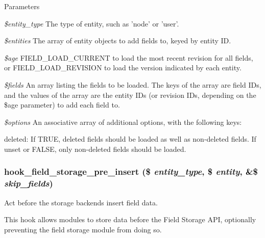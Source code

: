 \begin{DoxyParams}{Parameters}
\item[{\em \$entity\_\-type}]The type of entity, such as 'node' or 'user'. \item[{\em \$entities}]The array of entity objects to add fields to, keyed by entity ID. \item[{\em \$age}]FIELD\_\-LOAD\_\-CURRENT to load the most recent revision for all fields, or FIELD\_\-LOAD\_\-REVISION to load the version indicated by each entity. \item[{\em \$fields}]An array listing the fields to be loaded. The keys of the array are field IDs, and the values of the array are the entity IDs (or revision IDs, depending on the \$age parameter) to add each field to. \item[{\em \$options}]An associative array of additional options, with the following keys:
\begin{DoxyItemize}
\item deleted: If TRUE, deleted fields should be loaded as well as non-\/deleted fields. If unset or FALSE, only non-\/deleted fields should be loaded. 
\end{DoxyItemize}\end{DoxyParams}
\hypertarget{group__field__storage_gaa4fa274b87c435d41fc9267adedbec79}{
\subsubsection[{hook\_\-field\_\-storage\_\-pre\_\-insert}]{\setlength{\rightskip}{0pt plus 5cm}hook\_\-field\_\-storage\_\-pre\_\-insert (\$ {\em entity\_\-type}, \/  \$ {\em entity}, \/  \&\$ {\em skip\_\-fields})}}
\label{group__field__storage_gaa4fa274b87c435d41fc9267adedbec79}
Act before the storage backends insert field data.

This hook allows modules to store data before the Field Storage API, optionally preventing the field storage module from doing so.


